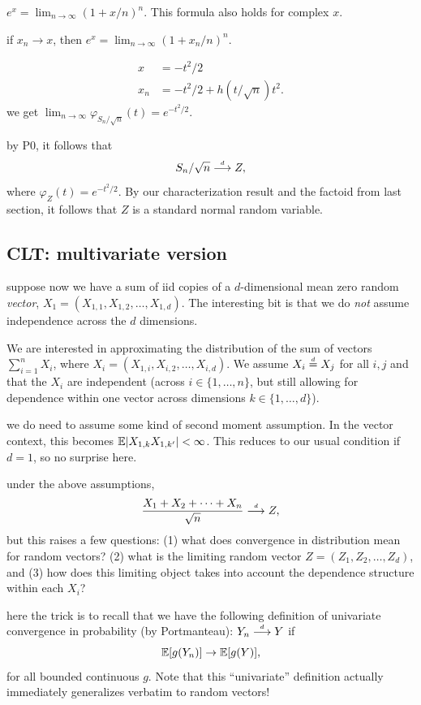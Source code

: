 \documentclass{article}
\begin{document}
 $e^x = \lim_{n\to\infty} (1 + x/n)^n$. This formula also holds for complex $x$.

 if $x_n \to x$, then $e^x = \lim_{n\to\infty} (1 + x_n/n)^n$.

\begin{align*}
x &= -t^2/2 \\
x_n &= -t^2/2 + h(t/\sqrt{n}) t^2.
\end{align*}
we get $\lim_{n\to\infty} \varphi_{S_n/\sqrt{n}}(t) = e^{-t^2/2}$.

 by P0, it follows that 
\[ S_n / \sqrt{n} \stackrel{\scriptscriptstyle d}{\longrightarrow} Z, \]
where $\varphi_Z(t) = e^{-t^2/2}$. By our characterization result and the factoid from last section, it follows that $Z$ is a standard normal random variable.


\subsection{CLT: multivariate version}

 suppose now we have a sum of iid copies of a $d$-dimensional mean zero random \emph{vector}, $X_1 = (X_{1,1}, X_{1,2}, \dots, X_{1,d})$. The interesting bit is that we do \emph{not} assume independence across the $d$ dimensions. 

 We are interested in approximating the distribution of the sum of vectors $\sum_{i=1}^n X_i$, where $X_i = (X_{1,i}, X_{i,2}, \dots, X_{i,d})$. We assume $X_i \stackrel{\scriptscriptstyle d}{=} X_j$ for all $i,j$ and that the $X_i$ are independent (across $i \in \{1, \dots, n\}$, but still allowing for dependence within one vector across dimensions $k \in \{1, \dots, d\}$).

 we do need to assume some kind of second moment assumption. In the vector context, this becomes ${\mathbb E}|X_{1,k} X_{1,k'}| < \infty$. This reduces to our usual condition if $d=1$, so no surprise here.

 under the above assumptions,
\[ \frac{X_1 + X_2 + \dots + X_n}{\sqrt{n}} \stackrel{\scriptscriptstyle d}{\longrightarrow} Z, \]
but this raises a few questions: (1) what does convergence in distribution mean for random vectors? (2) what is the limiting random vector $Z = (Z_1, Z_2, \dots, Z_d)$, and (3) how does this limiting object takes into account the dependence structure within each $X_i$?

 here the trick is to recall that we have the following definition of univariate convergence in probability (by Portmanteau): $Y_n \stackrel{\scriptscriptstyle d}{\longrightarrow} Y$ if
\[ {\mathbb E}[g(Y_n)] \to {\mathbb E}[g(Y)], \]
for all bounded continuous $g$. Note that this ``univariate'' definition actually immediately generalizes verbatim to random vectors!
\end{document}
